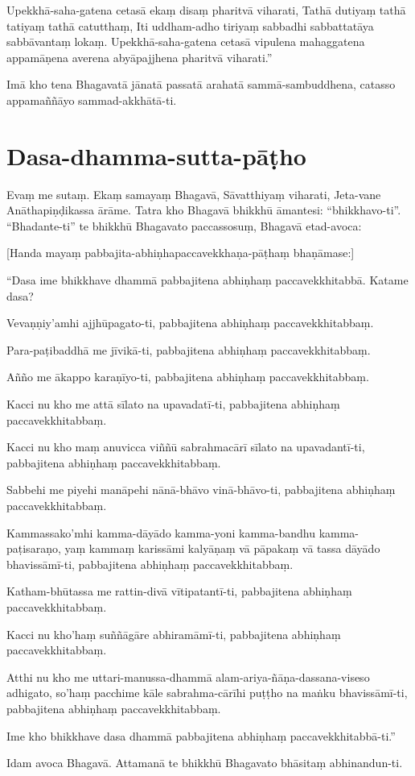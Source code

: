 Upekkhā-saha-gatena cetasā ekaṃ disaṃ pharitvā viharati, Tathā dutiyaṃ tathā
tatiyaṃ tathā catutthaṃ, Iti uddham-adho tiriyaṃ sabbadhi sabbattatāya
sabbāvantaṃ lokaṃ. Upekkhā-saha-gatena cetasā vipulena mahaggatena appamāṇena
averena abyāpajjhena pharitvā viharati.”

Imā kho tena Bhagavatā jānatā passatā arahatā sammā-sambuddhena, catasso
appamaññāyo sammad-akkhātā-ti.


\section{Dasa-dhamma-sutta-pāṭho}



Evaṃ me sutaṃ. Ekaṃ samayaṃ Bhagavā, Sāvatthiyaṃ viharati, Jeta-vane
Anāthapiṇḍikassa ārāme. Tatra kho Bhagavā bhikkhū āmantesi: “bhikkhavo-ti”.
“Bhadante-ti” te bhikkhū Bhagavato paccassosuṃ, Bhagavā etad-avoca:

[Handa mayaṃ pabbajita-abhiṇhapaccavekkhaṇa-pāṭhaṃ bhaṇāmase:]

“Dasa ime bhikkhave dhammā pabbajitena abhiṇhaṃ paccavekkhitabbā. Katame dasa?

Vevaṇṇiy’amhi ajjhūpagato-ti, pabbajitena abhiṇhaṃ paccavekkhitabbaṃ.

Para-paṭibaddhā me jīvikā-ti, pabbajitena abhiṇhaṃ paccavekkhitabbaṃ.

Añño me ākappo karaṇīyo-ti, pabbajitena abhiṇhaṃ paccavekkhitabbaṃ.

Kacci nu kho me attā sīlato na upavadatī-ti, pabbajitena abhiṇhaṃ paccavekkhitabbaṃ.

Kacci nu kho maṃ anuvicca viññū sabrahmacārī sīlato na upavadantī-ti, pabbajitena abhiṇhaṃ paccavekkhitabbaṃ.

Sabbehi me piyehi manāpehi nānā-bhāvo vinā-bhāvo-ti, pabbajitena abhiṇhaṃ paccavekkhitabbaṃ.

Kammassako’mhi kamma-dāyādo kamma-yoni kamma-bandhu kamma-paṭisaraṇo, yaṃ kammaṃ karissāmi kalyāṇaṃ vā pāpakaṃ vā tassa dāyādo bhavissāmī-ti, pabbajitena abhiṇhaṃ paccavekkhitabbaṃ.

Katham-bhūtassa me rattin-divā vītipatantī-ti, pabbajitena abhiṇhaṃ paccavekkhitabbaṃ.

Kacci nu kho’haṃ suññāgāre abhiramāmī-ti, pabbajitena abhiṇhaṃ paccavekkhitabbaṃ.

Atthi nu kho me uttari-manussa-dhammā alam-ariya-ñāṇa-dassana-viseso adhigato, so’haṃ pacchime kāle sabrahma-cārīhi puṭṭho na maṅku bhavissāmī-ti, pabbajitena abhiṇhaṃ paccavekkhitabbaṃ.

Ime kho bhikkhave dasa dhammā pabbajitena abhiṇhaṃ paccavekkhitabbā-ti.”

Idam avoca Bhagavā. Attamanā te bhikkhū Bhagavato bhāsitaṃ abhinandun-ti.


